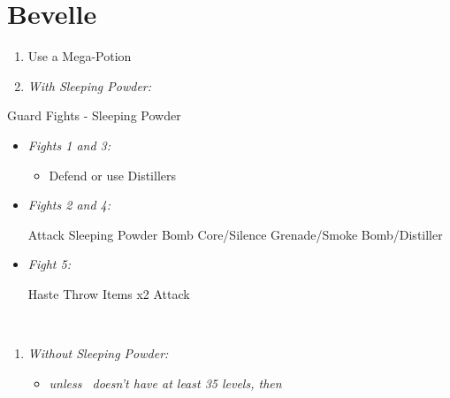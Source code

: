 \chapter{Bevelle}
\begin{enumerate}
	\item Use a Mega-Potion
	\item \textit{With Sleeping Powder:}
\end{enumerate}
\begin{battle}{Guard Fights - Sleeping Powder}
	\begin{itemize}
		\item \textit{Fights 1 and 3:}
		      \begin{itemize}
			      \tidusf Attack
			      \item Defend or use Distillers
		      \end{itemize}
		\item \textit{Fights 2 and 4:}
		      \begin{itemize}
			      \tidusf Attack
			      \rikkuf Sleeping Powder
			      \kimahrif Bomb Core/Silence Grenade/Smoke Bomb/Distiller
		      \end{itemize}
		\item \textit{Fight 5:}
		      \begin{itemize}
			      \tidusf Haste \rikku
			      \rikkuf Throw Items x2
			      \tidusf Attack
		      \end{itemize}
	\end{itemize}
\end{battle}
\vfill
\
\columnbreak
\begin{enumerate}[resume]
	\item \textit{Without Sleeping Powder:}
	      \begin{itemize}
		      \item \formation{\tidus}{\rikku}{\auron} \textit{unless \lulu\ doesn't have at least 35 levels, then } \formation{\tidus}{\rikku}{\lulu}
	      \end{itemize}
\end{enumerate}
